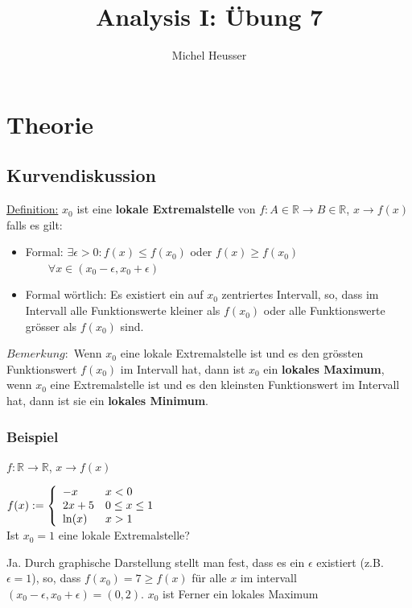 \documentclass[11pt]{article} %
\title{Analysis I: Übung 7}
\author{Michel Heusser}
\begin{document}
\maketitle

\section{Theorie}

\subsection{Kurvendiskussion}

\underline{Definition:} $x_0$ ist eine {\bf lokale Extremalstelle} von $f: A \in \mathbb{R} \rightarrow B \in \mathbb{R}$, $x \rightarrow f(x)$ falls es gilt:
\begin{itemize}
\item Formal: $\exists \epsilon>0: f(x) \leq f(x_0)$ oder $f(x) \geq f(x_0)$ $\qquad \forall x\in (x_0-\epsilon,x_0 + \epsilon)$
\item Formal wörtlich: Es existiert ein auf $x_0$ zentriertes Intervall, so, dass im Intervall alle Funktionswerte kleiner als $f(x_0)$ oder alle Funktionswerte grösser als $f(x_0)$ sind.
\end{itemize}

$Bemerkung:$ Wenn $x_0$ eine lokale Extremalstelle ist und es den grössten Funktionswert $f(x_0)$ im Intervall hat, dann ist $x_0$ ein {\bf lokales Maximum}, wenn $x_0$ eine Extremalstelle ist und es den kleinsten Funktionswert im Intervall hat, dann ist sie ein {\bf lokales Minimum}.

\subsubsection{Beispiel}

$f: \mathbb{R} \rightarrow \mathbb{R}$, $x\rightarrow f(x)$

$f(x) := \left \{ 
\begin{array}{l  l}
	-x & x<0\\
	2x+5 & 0\leq x\leq 1\\
	\ln(x) & x > 1
\end{array} \right.$ \\

Ist $x_0=1$ eine lokale Extremalstelle? 

Ja. Durch graphische Darstellung stellt man fest, dass es ein $\epsilon$ existiert (z.B. $\epsilon = 1$), so, dass $f(x_0) = 7 \geq f(x)$ für alle $x$ im intervall $(x_0 - \epsilon, x_0 + \epsilon) = (0,2)$. $x_0$ ist Ferner ein lokales Maximum
\end{document}
